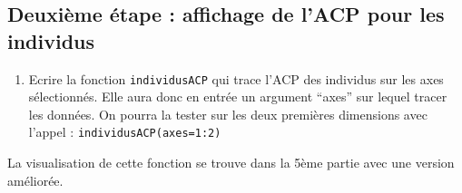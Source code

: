 \documentclass[
]{article}
\providecommand{\tightlist}{%
  \setlength{\itemsep}{0pt}\setlength{\parskip}{0pt}}
\begin{document}
\hypertarget{deuxiuxe8me-uxe9tape-affichage-de-lacp-pour-les-individus}{%
\subsection{Deuxième étape : affichage de l'ACP pour les
individus}\label{deuxiuxe8me-uxe9tape-affichage-de-lacp-pour-les-individus}}

\begin{enumerate}
\def\labelenumi{\arabic{enumi}.}
\setcounter{enumi}{1}
\tightlist
\item
  Ecrire la fonction \texttt{individusACP} qui trace l'ACP des individus
  sur les axes sélectionnés. Elle aura donc en entrée un argument
  ``axes'' sur lequel tracer les données. On pourra la tester sur les
  deux premières dimensions avec l'appel :
  \texttt{individusACP(axes=1:2)}
\end{enumerate}

La visualisation de cette fonction se trouve dans la 5ème partie avec
une version améliorée.
\end{document}
